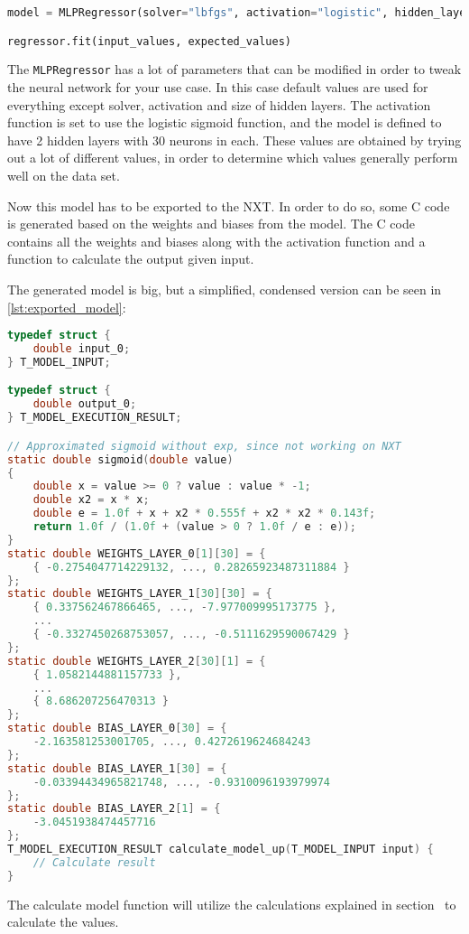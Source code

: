 \begin{lstlisting}[language=python,label={lst:mlpregressor},caption={Training a MLPRegressor with scikit}]
model = MLPRegressor(solver="lbfgs", activation="logistic", hidden_layer_sizes=(30, 30))

regressor.fit(input_values, expected_values)
\end{lstlisting}

The \texttt{MLPRegressor} has a lot of parameters that can be modified in order to tweak the neural network for your use case.
In this case default values are used for everything except solver, activation and size of hidden layers.
The activation function is set to use the logistic sigmoid function, and the model is defined to have 2 hidden layers with 30 neurons in each.
These values are obtained by trying out a lot of different values, in order to determine which values generally perform well on the data set.


Now this model has to be exported to the NXT. 
In order to do so, some C code is generated based on the weights and biases from the model.
The C code contains all the weights and biases along with the activation function and a function to calculate the output given input.

The generated model is big, but a simplified, condensed version can be seen in \autoref{lst:exported_model}:

\begin{lstlisting}[language=C,label={lst:exported_model},caption={Autogenerated model for getting power to move up}]
typedef struct {
	double input_0;
} T_MODEL_INPUT;

typedef struct {
	double output_0;
} T_MODEL_EXECUTION_RESULT;

// Approximated sigmoid without exp, since not working on NXT
static double sigmoid(double value)
{
	double x = value >= 0 ? value : value * -1;
	double x2 = x * x;
	double e = 1.0f + x + x2 * 0.555f + x2 * x2 * 0.143f;
	return 1.0f / (1.0f + (value > 0 ? 1.0f / e : e));
}
static double WEIGHTS_LAYER_0[1][30] = {
	{ -0.2754047714229132, ..., 0.28265923487311884 }
};
static double WEIGHTS_LAYER_1[30][30] = {
	{ 0.337562467866465, ..., -7.977009995173775 },
	...
	{ -0.3327450268753057, ..., -0.5111629590067429 }
};
static double WEIGHTS_LAYER_2[30][1] = {
	{ 1.0582144881157733 },
	...
	{ 8.686207256470313 }
};
static double BIAS_LAYER_0[30] = {
	-2.163581253001705, ..., 0.4272619624684243
};
static double BIAS_LAYER_1[30] = {
	-0.03394434965821748, ..., -0.9310096193979974
};
static double BIAS_LAYER_2[1] = {
	-3.0451938474457716
};
T_MODEL_EXECUTION_RESULT calculate_model_up(T_MODEL_INPUT input) {
	// Calculate result
}

\end{lstlisting}

The calculate model function will utilize the calculations explained in section~ to calculate the values.


